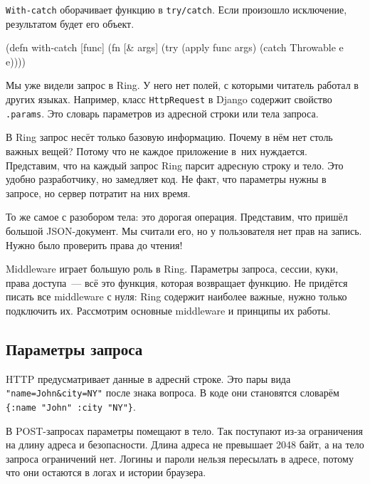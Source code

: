 
\verb|With-catch| оборачивает функцию в \verb|try/catch|. Если произошло
исключение, результатом будет его объект.

\begin{english}
  \begin{clojure}
(defn with-catch [func]
  (fn [& args]
    (try
      (apply func args)
      (catch Throwable e
        e))))
  \end{clojure}
\end{english}


Мы уже видели запрос в Ring. У него нет полей, с которыми читатель работал в
других языках. Например, класс \verb|HttpRequest| в Django содержит свойство
\verb|.params|. Это словарь параметров из адресной строки или тела запроса.

В Ring запрос несёт только базовую информацию. Почему в нём нет столь
важных вещей? Потому что не каждое приложение в~них нуждается. Представим, что
на каждый запрос Ring парсит адресную строку и тело. Это удобно разработчику, но
замедляет код. Не факт, что параметры нужны в запросе, но сервер потратит на них
время.

То же самое с разобором тела: это дорогая операция. Представим, что пришёл
большой JSON-документ. Мы считали его, но у пользователя нет прав на
запись. Нужно было проверить права до чтения!

Middleware играет большую роль в Ring. Параметры запроса, сессии, куки, права
доступа~--- всё это функция, которая возвращает функцию. Не придётся писать
все middleware с нуля: Ring содержит наиболее важные, нужно только подключить
их. Рассмотрим основные middleware и принципы их работы.

\subsection{Параметры запроса}

\label{ring-params}


HTTP предусматривает данные в адреснй строке. Это пары вида
\verb|"name=John&city=NY"| после знака вопроса. В коде они становятся
словарём \verb|{:name "John" :city "NY"}|.

В POST-запросах параметры помещают в тело. Так поступают из-за ограничения на
длину адреса и безопасности. Длина адреса не превышает 2048 байт, а на тело
запроса ограничений нет. Логины и пароли нельзя пересылать в адресе, потому что
они остаются в логах и истории браузера.

